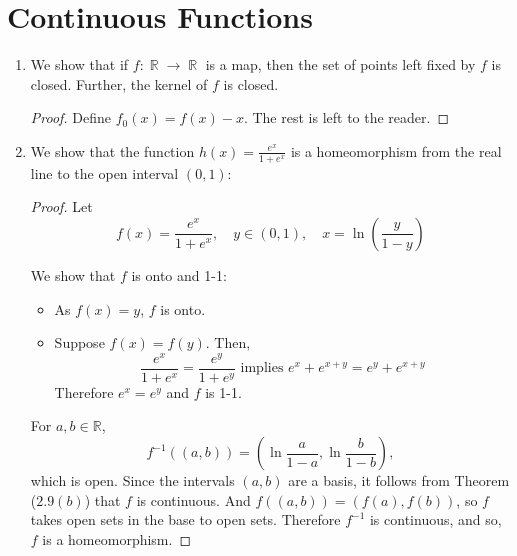 \documentclass{book}
\DeclareMathOperator*{\R}{\mathbb{R}}
\begin{document}
\section{Continuous Functions}
\begin{enumerate}[(1)]
    \item We show that if $f: \R \rightarrow \R$ is a map, then the set of points left fixed by $f$ is closed. Further, the kernel of $f$ is closed.
        \begin{proof} Define $f_0(x) = f(x) - x$. The rest is left to the reader. 
        \end{proof}

    \item We show that the function $h(x) = \frac{e^x}{1+e^x}$ is a homeomorphism from the real line to the open interval $(0,1)$: 
        \begin{proof} Let 
            \[f(x)=\frac{e^x}{1+e^x}, \quad y\in(0,1), \quad x=\ln\left(\frac{y}{1-y}\right)\]
            \par We show that $f$ is onto and 1-1: 
            \begin{itemize}
                \item As $f(x)=y$, $f$ is onto.

                \item Suppose $f(x)=f(y)$. Then, 
                    \[\frac{e^x}{1+e^x}=\frac{e^y}{1+e^y} \text{ implies } e^x+e^{x+y}=e^y+e^{x+y} \]
                    Therefore $e^x=e^y$ and $f$ is 1-1. 
            \end{itemize}
            For $a,b\in\mathbb R$, 
            \[f^{-1}((a,b))=\left(\ln\frac{a}{1-a},\ln\frac{b}{1-b}\right), \]
            which is open.  Since the intervals $(a,b)$ are a basis, it follows from Theorem ($2.9 (b)$) that $f$ is continuous.  And $f((a,b)) = (f(a),f(b))$, so $f$ takes open sets in the base to open sets.  Therefore $f^{-1}$ is continuous, and so, $f$ is a homeomorphism.
        \end{proof}


\end{enumerate}
\end{document}
